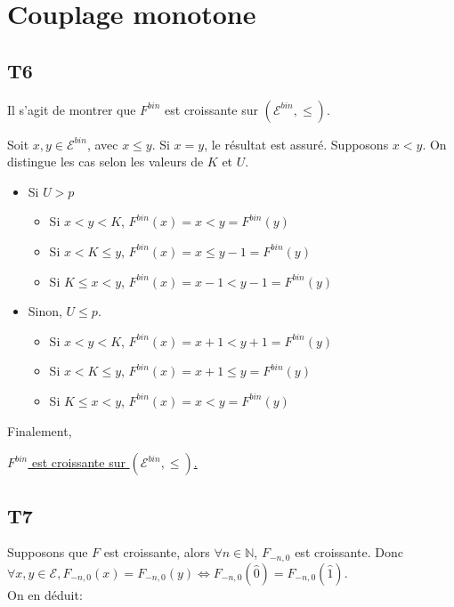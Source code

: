 \documentclass[a4paper,11pt]{article}
\def \E{\mathcal{E}}
\begin{document}
\section{Couplage monotone}

\subsection*{T6}

Il s'agit de montrer que $F^{bin}$ est croissante sur $(\E^{bin},\le)$.

Soit $x,y \in \E^{bin}$, avec $x\le y$. Si $x=y$, le résultat est assuré. Supposons $x<y$. On distingue les cas selon les valeurs de $K$ et $U$. 
\vspace{0.5cm}

\begin{itemize}
\item[\textbullet] Si $U>p$
	\begin{itemize}
	\item Si $x<y<K$, $F^{bin}(x) = x < y = F^{bin}(y)$
	\item Si $x<K\le y$, $F^{bin}(x) = x \le y-1 = F^{bin}(y)$
	\item Si $K\le x < y$, $F^{bin}(x) = x - 1 < y - 1 = F^{bin}(y)$
	\end{itemize}
\item[\textbullet] Sinon, $U\le p$.
	\begin{itemize}
	\item Si $x<y<K$, $F^{bin}(x) = x + 1 < y + 1= F^{bin}(y)$
	\item Si $x<K\le y$, $F^{bin}(x) = x +1 \le y = F^{bin}(y)$
	\item Si $K\le x < y$, $F^{bin}(x) = x < y = F^{bin}(y)$
	\end{itemize}
\end{itemize}
\vspace{0.5cm}

Finalement,
\begin{center}
 \underline{$F^{bin}$ est croissante sur  $(\E^{bin},\le)$.}
\end{center}

\subsection{T7}
Supposons que $F$ est croissante, alors $\forall n \in \mathbb{N}$, $F_{-n,0}$ est croissante.
Donc $\forall x,y \in \E, F_{-n,0}(x)=F_{-n,0}(y) \iff F_{-n,0}(\hat{0})=F_{-n,0}(\hat{1})$.\\
On en déduit:
\begin{center}
\end{center}
\end{document}
